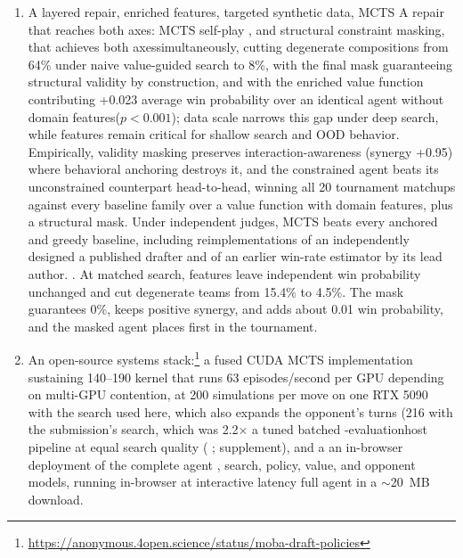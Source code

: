 \documentclass[journal]{IEEEtran}
\newcommand{\repourl}{\url{https://anonymous.4open.science/status/moba-draft-policies}}
\newcommand{\repourl}{\url{https://github.com/maxsegan/moba-draft-policies}}
\providecommand{\DIFaddtex}[1]{{\protect\color{blue} \sf #1}} %
\providecommand{\DIFdeltex}[1]{{\protect\color{red} \scriptsize #1}} %
\providecommand{\DIFaddbegin}{} %
\providecommand{\DIFaddend}{} %
\providecommand{\DIFdelbegin}{} %
\providecommand{\DIFdelend}{} %
\providecommand{\DIFadd}[1]{\texorpdfstring{\DIFaddtex{#1}}{#1}} %
\providecommand{\DIFdel}[1]{\texorpdfstring{\DIFdeltex{#1}}{}} %
\begin{document}
\begin{enumerate}
{ }\DIFaddend \item \DIFdelbegin \DIFdel{A layered repair, enriched features, targeted synthetic data, MCTS }\DIFdelend \DIFaddbegin \DIFadd{A repair that reaches both axes: MCTS }\DIFaddend self-play \DIFdelbegin \DIFdel{, and structural constraint masking, that achieves both axessimultaneously, cutting degenerate compositions from 64\% under naive value-guided search to 8\%, with the final mask guaranteeing structural validity by construction, and with the enriched value function contributing +0.023 average win probability over an identical agent without domain features($p < 0.001$); data scale narrows this gap under deep search, while features remain critical for shallow search and OOD behavior. Empirically, validity masking preserves interaction-awareness (synergy +0.95) where behavioral anchoring destroys it, and the constrained agent beats its unconstrained counterpart head-to-head, winning all 20 tournament matchups against every baseline family}\DIFdelend \DIFaddbegin \DIFadd{over a value function with domain features}\DIFaddend , \DIFaddbegin \DIFadd{plus a structural mask. Under independent judges, MCTS beats every anchored and greedy baseline, }\DIFaddend including reimplementations of \DIFdelbegin \DIFdel{an independently designed }\DIFdelend \DIFaddbegin \DIFadd{a }\DIFaddend published drafter and of an earlier win-rate estimator\DIFdelbegin \DIFdel{by its lead author. }\DIFdelend \DIFaddbegin \DIFadd{. At matched search, features leave independent win probability unchanged and cut degenerate teams from 15.4\% to 4.5\%. The mask guarantees 0\%, keeps positive synergy, and adds about 0.01 win probability, and the masked agent places first in the tournament.
 }\DIFaddend \item An open-source systems stack:\footnote{\repourl} a fused CUDA MCTS \DIFdelbegin \DIFdel{implementation sustaining 140--190 }\DIFdelend \DIFaddbegin \DIFadd{kernel that runs 63 }\DIFaddend episodes/second \DIFdelbegin \DIFdel{per GPU depending on multi-GPU contention, }\DIFdelend \DIFaddbegin \DIFadd{at 200 simulations per move on one RTX 5090 with the search used here, which also expands the opponent's turns (216 with the submission's search, which was }\DIFaddend 2.2$\times$ a tuned batched\DIFdelbegin \DIFdel{-evaluation}\DIFdelend  host pipeline at equal search quality\DIFdelbegin \DIFdel{(}\DIFdelend \DIFaddbegin \DIFadd{; }\DIFaddend supplement), and \DIFdelbegin \DIFdel{a }\DIFdelend \DIFaddbegin \DIFadd{an in-browser }\DIFaddend deployment of the \DIFdelbegin \DIFdel{complete agent , search, policy, value, and opponent models, running in-browser at interactive latency }\DIFdelend \DIFaddbegin \DIFadd{full agent }\DIFaddend in a $\sim$20~MB download.
\end{enumerate}
\end{document}
